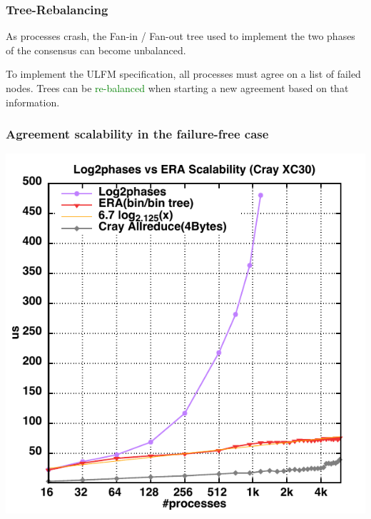 \begin{frame}
  \frametitle{Tree-Rebalancing}

  As processes crash, the Fan-in / Fan-out tree used to implement the
  two phases of the consensus can become unbalanced.

  \begin{center}
    \resizebox{!}{2cm}{\begin{tikzpicture}[>=latex',scale=.25]
        
      \end{tikzpicture}}
  \end{center}

  To implement the ULFM specification, \textcolor{green!50!black}{all
    processes} must agree on a list of failed nodes. Trees can be
  \textcolor{green}{re-balanced} when starting a
  \textcolor{red!50}{new agreement} based on that information.

  \begin{center}
    \resizebox{!}{2cm}{\begin{tikzpicture}[>=latex',scale=.25]
        
      \end{tikzpicture}}
  \end{center}

\end{frame}

\begin{frame}
  \frametitle{Agreement scalability in the failure-free case}

  \centering\includegraphics[height=.8\textheight]{eralog.pdf}

\end{frame}

